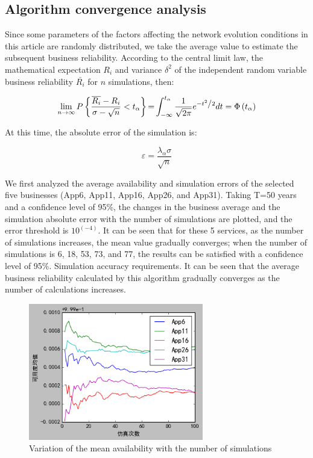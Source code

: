 \documentclass[journal]{IEEEtran}
\begin{document}
    \subsection{Algorithm convergence analysis}
    Since some parameters of the factors affecting the network evolution conditions in this article are randomly distributed, we take the average value to estimate the subsequent business reliability. According to the central limit law, the mathematical expectation $R_i$ and variance $\delta^2$ of the independent random variable business reliability $\bar{R_i}$ for $n$ simulations, then:

    \begin{equation}
        \mathop {\lim }\limits_{n \to \infty } P\left\{ {\frac{{\overline {{R_i}}  - {R_i}}}{{\sigma  - \sqrt n }} < {t_\alpha }} \right\}{\rm{ = }}\int_{{\rm{ - }}\infty }^{{t_\alpha }} {\frac{1}{{\sqrt {2\pi } }}} {e^{{{ - {t^2}} \mathord{\left/
                {\vphantom {{ - {t^2}} 2}} \right.
            \kern-\nulldelimiterspace} 2}}}dt = \Phi \left( {{t_\alpha }} \right)
    \end{equation}

    At this time, the absolute error of the simulation is:

    \begin{equation}
        \varepsilon  = \frac{{{\lambda _\alpha }\sigma }}{{\sqrt n }}
    \end{equation}

    We first analyzed the average availability and simulation errors of the selected five businesses (App6, App11, App16, App26, and App31). Taking T=50 years and a confidence level of 95\%, the changes in the business average and the simulation absolute error with the number of simulations are plotted, and the error threshold is $10^(-4)$. It can be seen that for these 5 services, as the number of simulations increases, the mean value gradually converges; when the number of simulations is 6, 18, 53, 73, and 77, the results can be satisfied with a confidence level of 95\%. Simulation accuracy requirements. It can be seen that the average business reliability calculated by this algorithm gradually converges as the number of calculations increases.

    \begin{figure}[!t]
        \begin{center}
            \includegraphics[width = 3in]{img/13.png}
            \caption{Variation of the mean availability with the number of simulations}
            \label{fig10}
        \end{center}
    \end{figure}
\end{document}
